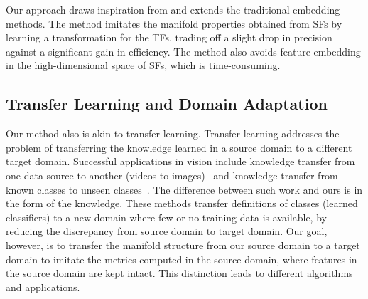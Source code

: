 Our approach draws inspiration from and extends the traditional
embedding methods. %
The method 
imitates the manifold properties obtained from SFs by learning a 
transformation for the TFs, trading off a slight drop in precision 
against a significant gain in efficiency. The method also avoids 
feature embedding in the high-dimensional space of SFs, which is 
time-consuming.





\subsection{Transfer Learning and Domain Adaptation}
Our method also is akin to transfer learning.  Transfer
learning addresses the problem of transferring the knowledge learned
in a source domain to a different target domain. Successful
applications in vision include knowledge transfer from one data source
to another (\eg videos to images)~\citep{tl:kernel:11, DA:iccv11,
  DASA:iccv13} and knowledge transfer from known classes to unseen
classes~\citep{tl:attribute:09}. The difference between such work and
ours is in the form of the knowledge. These methods transfer
definitions of classes (learned classifiers) to a new domain where few
or no training data is available, by reducing the discrepancy from
source domain to target domain. Our goal, however, is to transfer the
manifold structure from our source domain to a target domain to
imitate the metrics computed in the source domain, where features in
the source domain are kept intact. This distinction leads to 
different algorithms and applications.

